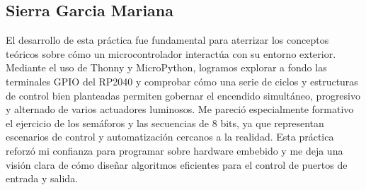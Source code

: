 \subsection{Sierra Garcia Mariana}
El desarrollo de esta práctica fue fundamental para aterrizar los conceptos teóricos sobre cómo un microcontrolador interactúa con su entorno exterior. Mediante el uso de Thonny y MicroPython, logramos explorar a fondo las terminales GPIO del RP2040 y comprobar cómo una serie de ciclos y estructuras de control bien planteadas permiten gobernar el encendido simultáneo, progresivo y alternado de varios actuadores luminosos. Me pareció especialmente formativo el ejercicio de los semáforos y las secuencias de 8 bits, ya que representan escenarios de control y automatización cercanos a la realidad. Esta práctica reforzó mi confianza para programar sobre hardware embebido y me deja una visión clara de cómo diseñar algoritmos eficientes para el control de puertos de entrada y salida.
